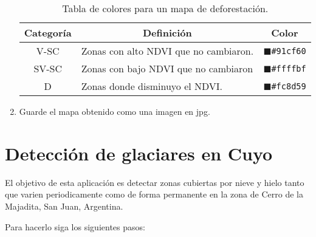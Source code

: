 \begin{enumerate}
\begin{table}[]
\centering
\begin{tabular}{@{}cll@{}}
\toprule
Categoría & \multicolumn{1}{c}{Definición}        & \multicolumn{1}{c}{Color}                       \\ \midrule
V-SC      & Zonas con alto NDVI que no cambiaron. & \textcolor{P1}{$\blacksquare$}\texttt{\#91cf60} \\
SV-SC     & Zonas con bajo NDVI que no cambiaron  & \textcolor{P2}{$\blacksquare$}\texttt{\#ffffbf} \\
D         & Zonas donde disminuyo el NDVI.        & \textcolor{P3}{$\blacksquare$}\texttt{\#fc8d59} \\ \bottomrule
\end{tabular}
\caption{Tabla de colores para un mapa de deforestación.}
\label{tab:def}
\end{table}

\item Guarde el mapa obtenido como una imagen en jpg.

\end{enumerate}

\section{Detección de glaciares en Cuyo}

El objetivo de esta aplicación es detectar zonas cubiertas por nieve y hielo tanto que varien periodicamente como de forma permanente en la zona de Cerro de la Majadita, San Juan, Argentina.

Para hacerlo siga los siguientes pasos:

